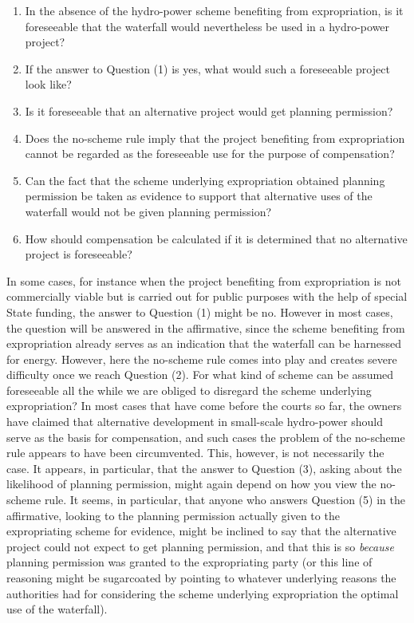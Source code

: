 \begin{enumerate}
\item In the absence of the hydro-power scheme benefiting from expropriation, is it foreseeable that the waterfall would nevertheless be used in a hydro-power project?
\item If the answer to Question (1) is yes, what would such a foreseeable project look like?
\item Is it foreseeable that an alternative project would get planning permission?
\item Does the no-scheme rule imply that the project benefiting from expropriation cannot be regarded as the foreseeable use for the purpose of compensation?
\item Can the fact that the scheme underlying expropriation obtained planning permission be taken as evidence to support that alternative uses of the waterfall would not be given planning permission?
\item How should compensation be calculated if it is determined that no alternative project is foreseeable? 
\end{enumerate}

In some cases, for instance when the project benefiting from expropriation is not commercially viable but is carried out for public purposes with the help of special State funding, the answer to Question (1) might be no. However in most cases, the question will be answered in the affirmative, since the scheme benefiting from expropriation already serves as an indication that the waterfall can be harnessed for energy. However, here the no-scheme rule comes into play and creates severe difficulty once we reach Question (2). For what kind of scheme can be assumed foreseeable all the while we are obliged to disregard the scheme underlying expropriation? In most cases that have come before the courts so far, the owners have claimed that alternative development in small-scale hydro-power should serve as the basis for compensation, and such cases the problem of the no-scheme rule appears to have been circumvented. This, however, is not necessarily the case. It appears, in particular, that the answer to Question (3), asking about the likelihood of planning permission, might again depend on how you view the no-scheme rule. It seems, in particular, that anyone who answers Question (5) in the affirmative, looking to the planning permission actually given to the expropriating scheme for evidence, might be inclined to say that the alternative project could not expect to get planning permission, and that this is so \emph{because} planning permission was granted to the expropriating party (or this line of reasoning might be sugarcoated by pointing to whatever underlying reasons the authorities had for considering the scheme underlying expropriation the optimal use of the waterfall).

